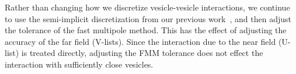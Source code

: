 Rather than changing how we discretize vesicle-vesicle interactions, we
continue to use the semi-implicit discretization from our previous
work~\cite{qua:bir2014a}, and then adjust the tolerance of the fast
multipole method.  This has the effect of adjusting the accuracy of the
far field (V-lists).  Since the interaction due to the near field
(U-list) is treated directly, adjusting the FMM tolerance does not
effect the interaction with sufficiently close vesicles.



